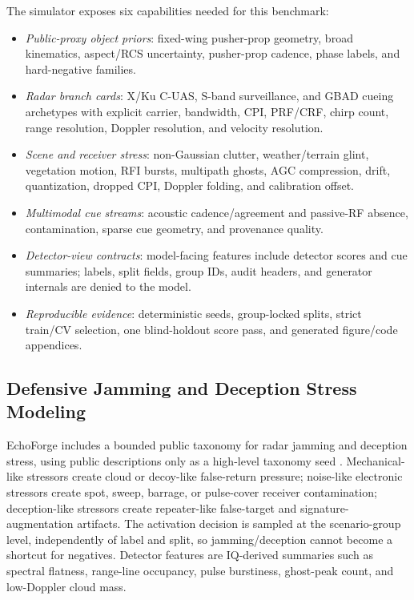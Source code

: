 \documentclass[10pt,journal]{IEEEtran}
\begin{document}
The simulator exposes six capabilities needed for this benchmark:
\begin{itemize}
  \item \textit{Public-proxy object priors}: fixed-wing pusher-prop geometry, broad kinematics, aspect/RCS uncertainty, pusher-prop cadence, phase labels, and hard-negative families.
  \item \textit{Radar branch cards}: X/Ku C-UAS, S-band surveillance, and GBAD cueing archetypes with explicit carrier, bandwidth, CPI, PRF/CRF, chirp count, range resolution, Doppler resolution, and velocity resolution.
  \item \textit{Scene and receiver stress}: non-Gaussian clutter, weather/terrain glint, vegetation motion, RFI bursts, multipath ghosts, AGC compression, drift, quantization, dropped CPI, Doppler folding, and calibration offset.
  \item \textit{Multimodal cue streams}: acoustic cadence/agreement and passive-RF absence, contamination, sparse cue geometry, and provenance quality.
  \item \textit{Detector-view contracts}: model-facing features include detector scores and cue summaries; labels, split fields, group IDs, audit headers, and generator internals are denied to the model.
  \item \textit{Reproducible evidence}: deterministic seeds, group-locked splits, strict train/CV selection, one blind-holdout score pass, and generated figure/code appendices.
\end{itemize}

\subsection{Defensive Jamming and Deception Stress Modeling}
EchoForge includes a bounded public taxonomy for radar jamming and deception stress, using public descriptions only as a high-level taxonomy seed \cite{radarJammingDeceptionWiki}. Mechanical-like stressors create cloud or decoy-like false-return pressure; noise-like electronic stressors create spot, sweep, barrage, or pulse-cover receiver contamination; deception-like stressors create repeater-like false-target and signature-augmentation artifacts. The activation decision is sampled at the scenario-group level, independently of label and split, so jamming/deception cannot become a shortcut for negatives. Detector features are IQ-derived summaries such as spectral flatness, range-line occupancy, pulse burstiness, ghost-peak count, and low-Doppler cloud mass.
\end{document}
